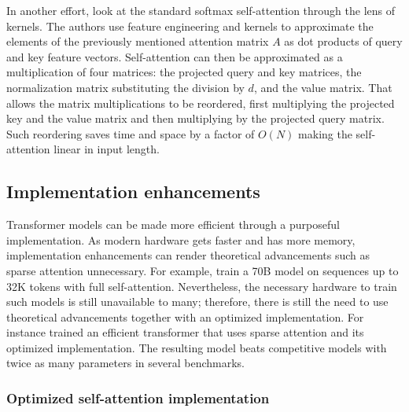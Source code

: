 In another effort, \cite{choromanski2020rethinking} look at the standard
softmax self-attention through the lens of kernels. The authors use feature
engineering and kernels to approximate the elements of the previously mentioned attention
matrix $A$ as dot products of query and key feature vectors. Self-attention can
then be approximated as a multiplication of four matrices: the projected query
and key matrices, the normalization matrix substituting the division by $d$, and
the value matrix. That allows the matrix multiplications to be reordered, first
multiplying the projected key and the value matrix and then multiplying
by the projected query matrix. Such reordering saves time and space by a
factor of $O(N)$ making the self-attention linear in input length.

\subsection{Implementation enhancements}

Transformer models can be made more efficient through a purposeful
implementation. As modern hardware gets faster and has more memory,
implementation enhancements can render theoretical advancements such as sparse
attention unnecessary. For example, \cite{xiong2023effective} train a 70B model
on sequences up to 32K tokens with full self-attention. Nevertheless, the
necessary hardware to train such models is still unavailable to many;
therefore, there is still the need to use theoretical advancements together
with an optimized implementation. For instance \cite{jiang2023mistral} trained
an efficient transformer that uses sparse attention and its optimized
implementation. The resulting model beats competitive models with twice as many
parameters in several benchmarks.

\subsubsection{Optimized self-attention implementation}

